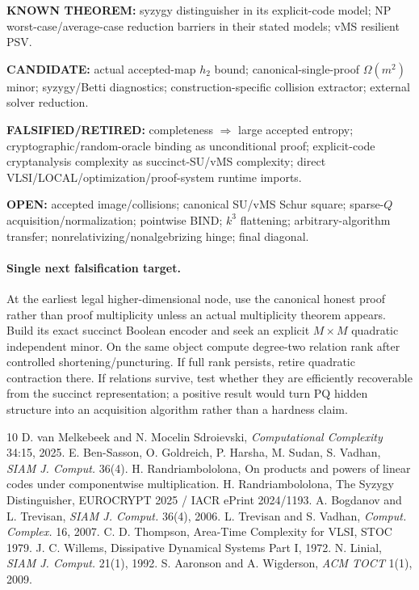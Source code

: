 \documentclass[11pt]{article}
\begin{document}
\textbf{KNOWN THEOREM:} syzygy distinguisher in its explicit-code model; NP worst-case/average-case reduction barriers in their stated models; vMS resilient PSV.

\textbf{CANDIDATE:} actual accepted-map $h_2$ bound; canonical-single-proof $\Omega(m^2)$ minor; syzygy/Betti diagnostics; construction-specific collision extractor; external solver reduction.

\textbf{FALSIFIED/RETIRED:} completeness $\Rightarrow$ large accepted entropy; cryptographic/random-oracle binding as unconditional proof; explicit-code cryptanalysis complexity as succinct-SU/vMS complexity; direct VLSI/LOCAL/optimization/proof-system runtime imports.

\textbf{OPEN:} accepted image/collisions; canonical SU/vMS Schur square; sparse-$Q$ acquisition/normalization; pointwise BIND; $k^3$ flattening; arbitrary-algorithm transfer; nonrelativizing/nonalgebrizing hinge; final diagonal.

\paragraph{Single next falsification target.}
At the earliest legal higher-dimensional node, use the canonical honest proof rather than proof multiplicity unless an actual multiplicity theorem appears. Build its exact succinct Boolean encoder and seek an explicit $M\times M$ quadratic independent minor. On the same object compute degree-two relation rank after controlled shortening/puncturing. If full rank persists, retire quadratic contraction there. If relations survive, test whether they are efficiently recoverable from the succinct representation; a positive result would turn PQ hidden structure into an acquisition algorithm rather than a hardness claim.

\begin{thebibliography}{10}
 D. van Melkebeek and N. Mocelin Sdroievski, \emph{Computational Complexity} 34:15, 2025.
 E. Ben-Sasson, O. Goldreich, P. Harsha, M. Sudan, S. Vadhan, \emph{SIAM J. Comput.} 36(4).
 H. Randriambololona, On products and powers of linear codes under componentwise multiplication.
 H. Randriambololona, The Syzygy Distinguisher, EUROCRYPT 2025 / IACR ePrint 2024/1193.
 A. Bogdanov and L. Trevisan, \emph{SIAM J. Comput.} 36(4), 2006.
 L. Trevisan and S. Vadhan, \emph{Comput. Complex.} 16, 2007.
 C. D. Thompson, Area-Time Complexity for VLSI, STOC 1979.
 J. C. Willems, Dissipative Dynamical Systems Part I, 1972.
 N. Linial, \emph{SIAM J. Comput.} 21(1), 1992.
 S. Aaronson and A. Wigderson, \emph{ACM TOCT} 1(1), 2009.
\end{thebibliography}
\end{document}
